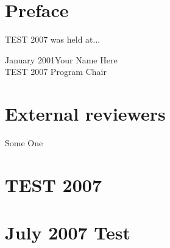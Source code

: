 \documentclass{llncs}
\begin{document}
%
\frontmatter          %
%
\pagestyle{headings}  %
%
\chapter*{Preface}
%
TEST 2007 was held at...
%

\begin{flushright}\noindent
January 2001\hfill Your Name Here\\
TEST 2007 Program Chair
\end{flushright}
%
\chapter*{External reviewers}
%
\begin{multicols}{3}
\noindent
Some One\\ 
\end{multicols}
%
\chapter*{{\huge TEST 2007}\\
\ \\
July 2007 Test}
\end{document}

